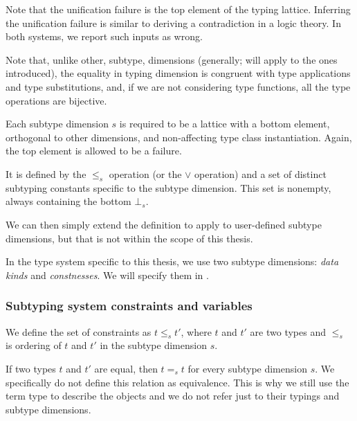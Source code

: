 \begin{remark}
    Note that the unification failure is the top element of the typing lattice. Inferring the unification failure is similar to deriving a contradiction in a logic theory. In both systems, we report such inputs as wrong.
\end{remark}


\begin{remark}
    Note that, unlike other, subtype, dimensions (generally; will apply to the ones introduced), the equality in typing dimension is congruent with type applications and type substitutions, and, if we are not considering type functions, all the type operations are bijective.
\end{remark}

\begin{defn}
    \label{st_dim}
    Each subtype dimension $s$ is required to be a lattice with a bottom element, orthogonal to other dimensions, and non-affecting type class instantiation. Again, the top element is allowed to be a failure.

    It is defined by the $\leq_s$ operation (or the $\lor$ operation) and a set of distinct subtyping constants specific to the subtype dimension. This set is nonempty, always containing the bottom $\bot_s$.

    We can then simply extend the definition to apply to user-defined subtype dimensions, but that is not within the scope of this thesis.

    In the type system specific to this thesis, we use two subtype dimensions: \emph{data kinds} and \emph{constnesses}. We will specify them in .
\end{defn}


\subsubsection{Subtyping system constraints and variables}

\begin{defn}
    We define the set of constraints as $t \leq_s t'$, where $t$ and $t'$ are two types and $\leq_s$ is ordering of $t$ and $t'$ in the subtype dimension $s$.
\end{defn}

\begin{defn}
    If two types $t$ and $t'$ are equal, then $t =_s t$ for every subtype dimension $s$. We specifically do not define this relation as equivalence. This is why we still use the term type to describe the objects and we do not refer just to their typings and subtype dimensions.
\end{defn}

